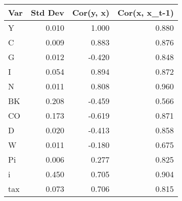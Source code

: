 \begin{tabular}{lrrr}
\toprule
Var & Std Dev & Cor(y, x) & Cor(x, x_t-1) \\
\midrule
Y & 0.010 & 1.000 & 0.880 \\
C & 0.009 & 0.883 & 0.876 \\
G & 0.012 & -0.420 & 0.848 \\
I & 0.054 & 0.894 & 0.872 \\
N & 0.011 & 0.808 & 0.960 \\
BK & 0.208 & -0.459 & 0.566 \\
CO & 0.173 & -0.619 & 0.871 \\
D & 0.020 & -0.413 & 0.858 \\
W & 0.011 & -0.180 & 0.675 \\
Pi & 0.006 & 0.277 & 0.825 \\
i & 0.450 & 0.705 & 0.904 \\
tax & 0.073 & 0.706 & 0.815 \\
\bottomrule
\end{tabular}

